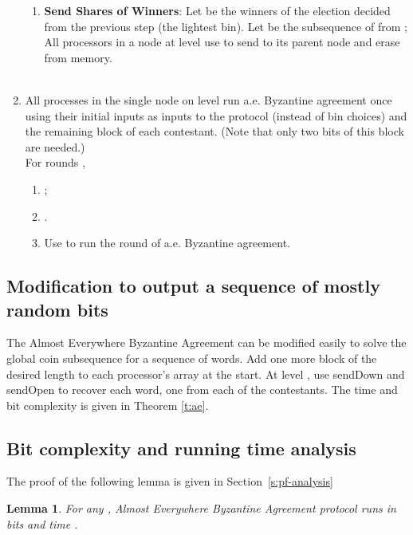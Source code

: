 \documentclass[letterpaper,11pt]{article}
\newtheorem{lemma}{Lemma}
\begin{document}
\begin{algorithm}
\begin{enumerate}
\begin{enumerate}
\item {\bf Send Shares of Winners}: 
Let  be the winners of the election decided from the previous step (the lightest bin).  Let  be the subsequence of  from ;   All processors in a node at level  use  to  send  to its parent node
and erase  from memory. \\
   \\
\end{enumerate}
\item
All  processes in the single node on level  run a.e. Byzantine agreement once using their initial inputs  as inputs to the protocol  (instead of bin choices) and the remaining block of each contestant. (Note that only two bits of  this block are needed.) \\
For rounds , 

 \begin{enumerate}
\item
 ;

 \item
 . 
\item
Use  to run the  round of a.e. Byzantine agreement. 
\end{enumerate}


\end{enumerate}
\end{algorithm}

\subsection{Modification to output a sequence of mostly random bits}\label{GCS}

The Almost Everywhere Byzantine Agreement can be modified easily to solve the global coin subsequence  for  a sequence of  words.  Add one more block of the desired length to each processor's array at the start. At level , use sendDown and sendOpen to recover each word, one from each of the  contestants. The time and bit complexity is given in Theorem \ref{t:ae}. 

\subsection{Bit complexity and running time analysis}\label{analysis}

The proof of the following lemma is given in Section~\ref{s:pf-analysis}

\begin{lemma}\label{l:analysis}
For any , Almost Everywhere Byzantine Agreement protocol runs in  bits  and time .
\end{lemma}
\end{document}
